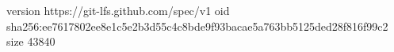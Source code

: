 version https://git-lfs.github.com/spec/v1
oid sha256:ee7617802ee8e1c5e2b3d55c4c8bde9f93bacae5a763bb5125ded28f816f99c2
size 43840
